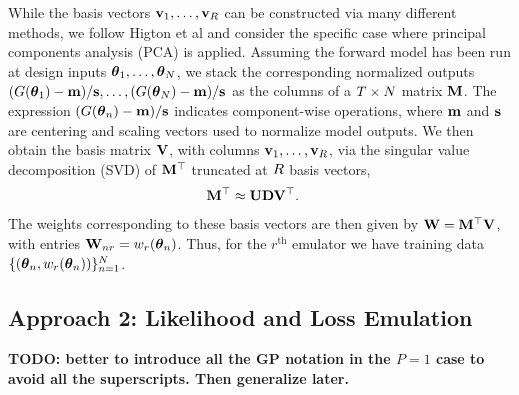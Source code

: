 \documentclass[12pt]{article}
\begin{document}
While the basis vectors $\mathbf{v}_1, \dots, \mathbf{v}_{R}$ can be constructed via many different methods, we follow Higton et al and 
consider the specific case where principal components analysis (PCA) is applied. Assuming the forward model has been run at design inputs $\boldsymbol{\theta}_1, \dots, \boldsymbol{\theta}_N$, we 
stack the corresponding normalized outputs $(G(\boldsymbol{\theta}_1) - \mathbf{m})/\mathbf{s}, \dots, (G(\boldsymbol{\theta}_N) - \mathbf{m})/\mathbf{s}$ as the columns of a 
$T \times N$ matrix $\mathbf{M}$. The expression $(G(\boldsymbol{\theta}_{n}) - \mathbf{m})/\mathbf{s}$ indicates component-wise operations, 
where $\mathbf{m}$ and $\mathbf{s}$ are centering and scaling vectors used to normalize model outputs. We then obtain the basis matrix $\mathbf{V}$, with columns 
$\mathbf{v}_1, \dots, \mathbf{v}_{R}$, via the singular value decomposition (SVD) of $\mathbf{M}^\top$ truncated at $R$ basis vectors, 
\begin{align}
\mathbf{M}^\top &\approx \mathbf{U} \mathbf{D} \mathbf{V}^\top. 
\end{align}
The weights corresponding to these basis vectors are then given by $\mathbf{W} = \mathbf{M}^\top \mathbf{V}$, with entries 
$\mathbf{W}_{n r} = w_{r}(\boldsymbol{\theta}_{n})$. Thus, for the $r^{\text{th}}$ emulator we have training data 
$\{(\boldsymbol{\theta}_{n},  w_{r}(\boldsymbol{\theta}_{n}))\}_{n = 1}^{N}$. 

\subsection{Approach 2: Likelihood and Loss Emulation}
\textbf{TODO: better to introduce all the GP notation in the $P = 1$ case to avoid all the superscripts. Then generalize later.}
\end{document}
